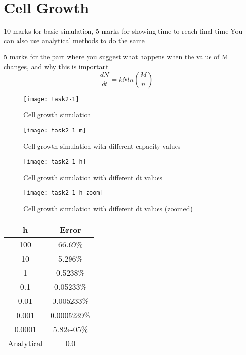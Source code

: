 \clearpage

\section{Cell Growth}
10 marks for basic simulation, 5 marks for showing time to reach final time 
You can also use analytical methods to do the same

5 marks for the part where you suggest what happens when the value of M changes, and why this is important
\[ \frac{dN}{dt}  = kNln\left(\frac{M}{n} \right) \]

\clearpage

\begin{figure}[ht]
    \centering
    \texttt{[image: task2-1]}
    \caption[Cell growth simulation]{Cell growth simulation}
    \label{fig:task2-1}
\end{figure}

\begin{figure}[ht]
    \centering
    \texttt{[image: task2-1-m]}
    \caption[Cell growth simulation with different capacity values]{Cell growth simulation with different capacity values}
    \label{fig:task2-1-m}
\end{figure}

\clearpage

\begin{figure}[ht]
    \centering
    \texttt{[image: task2-1-h]}
    \caption[Cell growth simulation with different dt values]{Cell growth simulation with different dt values}
    \label{fig:task2-1-h}
\end{figure}

\begin{figure}[ht]
    \centering
    \texttt{[image: task2-1-h-zoom]}
    \caption[Cell growth simulation with different dt values (zoomed)]{Cell growth simulation with different dt values (zoomed)}
    \label{fig:task2-1-h-zoom}
\end{figure}

\begin{center}
\begin{tabular}{c | c} 
    h & Error \\
    \hline
    100 & 66.69\% \\
    10 & 5.296\% \\
    1 & 0.5238\% \\
    0.1 & 0.05233\% \\
    0.01 & 0.005233\% \\
    0.001 & 0.0005239\% \\
    0.0001 & 5.82e-05\% \\
    Analytical & 0.0 \\
\end{tabular}
\end{center}

